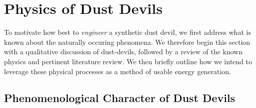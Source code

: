 \section{Physics of Dust Devils}
\label{sec:physics}


To motivate how best to \textit{engineer} a synthetic
dust devil, we first address what is known about the naturally occuring
phenomena. We therefore begin this section with a qualitative discussion
of dust-devils, followed by a review of the known physics and pertinent 
literature review. We then briefly outline how we intend to leverage
these physical processes as a method of usable energy generation. 


\subsection{Phenomenological Character of Dust Devils}


